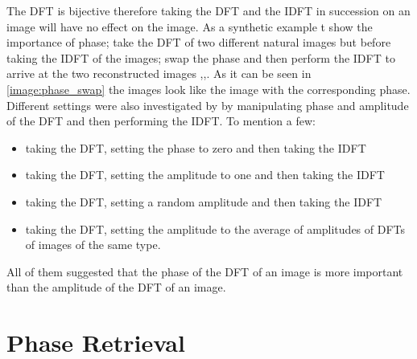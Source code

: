 The \ac{DFT} is bijective\cite{Frazier1999}\cite{Bredies2018}\cite{Damelin2011} therefore taking the \ac{DFT} and the \ac{IDFT} in succession on an image will have no effect on the image.
 As a synthetic example t show the importance of phase; take the \ac{DFT} of two different natural images but before taking the \ac{IDFT} of the images; swap the phase and then perform the 
 \ac{IDFT} to arrive at the two reconstructed images \cite{Oppenheim1979},\cite{Oppenheim1981},\cite{Shechtman2015}. 
 As it can be seen in \cref{image:phase_swap} the images look like the image with the corresponding phase. Different settings were also investigated by \cite{Oppenheim1979}\cite{Oppenheim1981} by 
 manipulating phase and amplitude of the \ac{DFT} and then performing the \ac{IDFT}. To mention a few: 
 \begin{itemize}
	\item taking the \ac{DFT}, setting the phase to zero and then taking the \ac{IDFT}\cite{Oppenheim1981}
	\item taking the \ac{DFT}, setting the amplitude to one and then taking the \ac{IDFT}\cite{Oppenheim1981}
	\item taking the \ac{DFT}, setting a random amplitude and then taking the \ac{IDFT}\cite{Oppenheim1981}
	\item taking the \ac{DFT}, setting the amplitude to the average of amplitudes of \ac{DFT}s of images of the same type\cite{Oppenheim1981}.
 \end{itemize} 
 All of them suggested that the phase of the \ac{DFT} of an image 
 is more important than the amplitude of the \ac{DFT} of an image\cite{Oppenheim1979}\cite{Oppenheim1981}.  

\section{Phase Retrieval}

